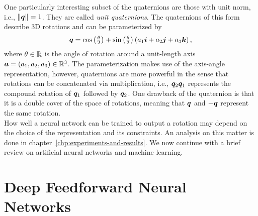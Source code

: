 		One particularly interesting subset of the quaternions are those with unit norm, i.e., $\lVert \bm{q} \rVert = 1$.
		They are called \emph{unit quaternions}.
		The quaternions of this form describe 3D rotations and can be parameterized by
		\begin{equation}
			\bm{q} = 
			\cos\left(\tfrac{\theta}{2}\right) + 
			\sin\left(\tfrac{\theta}{2}\right) \left(a_1 \bm{i} + a_2 \bm{j} + a_3 \bm{k}\right),
		\end{equation}
		where $\theta \in \mathbb{R}$ is the angle of rotation around a unit-length axis $\bm{a} = (a_1, a_2, a_3) \in \mathbb{R}^3$.
		The parameterization makes use of the axis-angle representation, however, quaternions are more powerful in the sense that rotations can be concatenated via multiplication, i.e., $\bm{q}_2 \bm{q}_1$ represents the compound rotation of $\bm{q}_1$ followed by $\bm{q}_2$.
		One drawback of the quaternion is that it is a double cover of the space of rotations, meaning that $\bm{q}$ and $-\bm{q}$ represent the same rotation.
		\\
		
		How well a neural network can be trained to output a rotation may depend on the choice of the representation and its constraints.
		An analysis on this matter is done in chapter~\ref{chp:experiments-and-results}.
		We now continue with a brief review on artificial neural networks and machine learning.
		
	\section{Deep Feedforward Neural Networks}
		
